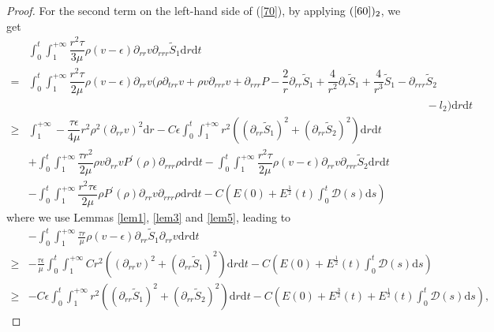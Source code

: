 \documentclass[10pt,reqno]{amsart}
\numberwithin{equation}{section}
\begin{document}
\begin{proof}
		For the second term on the left-hand side of (\ref{70}), by applying $(\ref{60})_2$, we get
		\begin{align}\label{88}
				&\int_{0}^{t}\int_{1}^{+\infty}\dfrac{r^2\tau}{3\mu}\rho (v-\epsilon)\partial_{rr} v\partial_{rrr} \tilde{S}_1\mathrm{d}r\mathrm{d}t \nonumber\\
				=&\int_{0}^{t}\int_{1}^{+\infty}\dfrac{r^2\tau}{2\mu}\rho (v-\epsilon)\partial_{rr} v\big(\rho\partial_{trr} v+\rho v\partial_{rrr} v+\partial_{rrr} P-\dfrac{2}{r} \partial_{rr} \tilde{S}_1+\dfrac{4}{r^2} \partial_{r} \tilde{S}_1
				+\dfrac{4}{r^3}\tilde{S}_1-\partial_{rrr} \tilde{S}_2 \nonumber\\
				&\qquad\qquad\qquad\qquad\qquad\qquad\qquad\qquad\qquad\qquad\qquad\qquad\qquad\qquad\qquad\qquad\qquad\qquad-l_2\big)
				\mathrm{d}r\mathrm{d}t \nonumber\\
				\geq&\int_{1}^{+\infty}-\dfrac{\tau\epsilon}{4\mu}r^2\rho^2(\partial_{rr} v)^2\mathrm{d}r
				-C\epsilon\int_{0}^{t}\int_{1}^{+\infty}r^2\left((\partial_{rr} \tilde{S}_1)^2+(\partial_{rr} \tilde{S}_2)^2\right)\mathrm{d}r\mathrm{d}t
				\nonumber\\
				&+\int_{0}^{t}\int_{1}^{+\infty}\dfrac{\tau r^2}{2\mu}\rho v \partial_{rr}v P^{\prime}(\rho) \partial_{rrr}\rho\mathrm{d}r\mathrm{d}t
				-\int_{0}^{t}\int_{1}^{+\infty}\dfrac{r^2\tau}{2\mu}\rho (v-\epsilon) \partial_{rr}v\partial_{rrr} \tilde{S}_2 \mathrm{d}r\mathrm{d}t \nonumber\\
				&-\int_{0}^{t}\int_{1}^{+\infty}\dfrac{r^2\tau\epsilon}{2\mu}\rho P^{\prime}(\rho)\partial_{rr}v\partial_{rrr}\rho \mathrm{d}r\mathrm{d}t
				-C\left(E(0)+ E^{\frac{1}{2}}(t) \int_{0}^{t}\mathcal{D}(s)\mathrm{d}s\right)
			\end{align}
		where we use Lemmas \ref{lem1}, \ref{lem3} and \ref{lem5}, leading to
		\begin{equation}\nonumber
			\begin{aligned}
				&-\int_{0}^{t}\int_{1}^{+\infty}\frac{\tau r}{\mu}\rho(v-\epsilon) \partial_{rr} \tilde{S}_1\partial_{rr}v\mathrm{d}r\mathrm{d}t\\
				\geq&-\frac{\tau\epsilon}{\mu} \int_{0}^{t}\int_{1}^{+\infty}Cr^2 \left((\partial_{rr}v)^2+(\partial_{rr} \tilde{S}_1)^2\right)\mathrm{d}r\mathrm{d}t
				-C\left(E(0)+ E^{\frac{1}{2}}(t) \int_{0}^{t}\mathcal{D}(s)\mathrm{d}s\right)\\
				\geq&-C\epsilon\int_{0}^{t}\int_{1}^{+\infty}r^2\left((\partial_{rr} \tilde{S}_1)^2+(\partial_{rr} \tilde{S}_2)^2\right)\mathrm{d}r\mathrm{d}t
				-C\left(E(0)+ E^{\frac{3}{2}}(t)+ E^{\frac{1}{2}}(t) \int_{0}^{t}\mathcal{D}(s)\mathrm{d}s\right),

\end{aligned}
\end{equation}
\end{proof}
\end{document}
